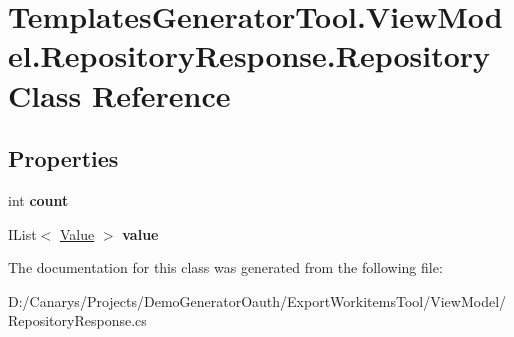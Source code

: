 \hypertarget{class_templates_generator_tool_1_1_view_model_1_1_repository_response_1_1_repository}{}\section{Templates\+Generator\+Tool.\+View\+Model.\+Repository\+Response.\+Repository Class Reference}
\label{class_templates_generator_tool_1_1_view_model_1_1_repository_response_1_1_repository}
\subsection*{Properties}
\begin{DoxyCompactItemize}
\item 
\mbox{\label{class_templates_generator_tool_1_1_view_model_1_1_repository_response_1_1_repository_a443cabc56e299869574a726ba5e7371d}} 
int {\bfseries count}
\item 
\mbox{\label{class_templates_generator_tool_1_1_view_model_1_1_repository_response_1_1_repository_a25068dbd4594d583515bb3c93ba780f0}} 
I\+List$<$ \mbox{\hyperlink{class_templates_generator_tool_1_1_view_model_1_1_repository_response_1_1_value}{Value}} $>$ {\bfseries value}
\end{DoxyCompactItemize}


The documentation for this class was generated from the following file\+:\begin{DoxyCompactItemize}
\item 
D\+:/\+Canarys/\+Projects/\+Demo\+Generator\+Oauth/\+Export\+Workitems\+Tool/\+View\+Model/Repository\+Response.\+cs\end{DoxyCompactItemize}
